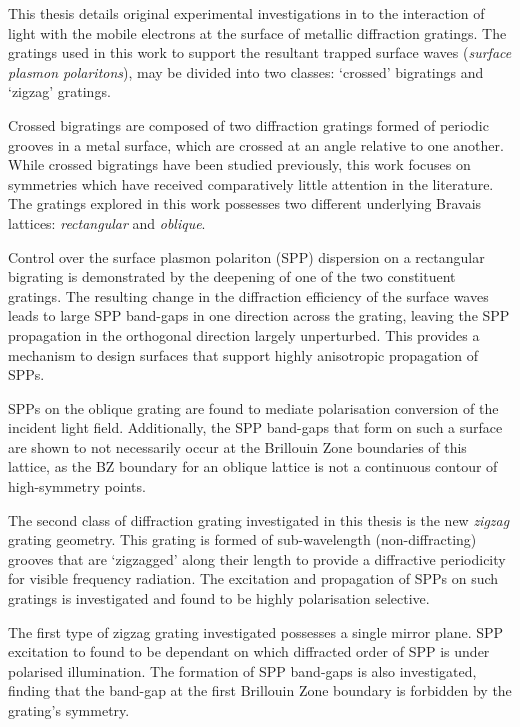 

\begin{abstracts}        %
This thesis details original experimental investigations in to the interaction of light with the mobile electrons at the surface of metallic diffraction gratings. The gratings used in this work to support the resultant trapped surface waves (\textit{surface plasmon polaritons}), may be divided into two classes: `crossed' bigratings and `zigzag' gratings. 

Crossed bigratings are composed of two diffraction gratings formed of periodic grooves in a metal surface, which are crossed at an angle relative to one another. While crossed bigratings have been studied previously, this work focuses on symmetries which have received comparatively little attention in the literature. The gratings explored in this work possesses two different underlying Bravais lattices: \textit{rectangular} and \textit{oblique}.

Control over the surface plasmon polariton (SPP) dispersion on a rectangular bigrating is demonstrated by the deepening of one of the two constituent gratings. The resulting change in the diffraction efficiency of the surface waves leads to large SPP band-gaps in one direction across the grating, leaving the SPP propagation in the orthogonal direction largely unperturbed. This provides a mechanism to design surfaces that support highly anisotropic propagation of SPPs.

SPPs on the oblique grating are found to mediate polarisation conversion of the incident light field. Additionally, the SPP band-gaps that form on such a surface are shown to not necessarily occur at the Brillouin Zone boundaries of this lattice, as the BZ boundary for an oblique lattice is not a continuous contour of high-symmetry points.

The second class of diffraction grating investigated in this thesis is the new \textit{zigzag} grating geometry. This grating is formed of sub-wavelength (non-diffracting) grooves that are `zigzagged' along their length to provide a diffractive periodicity for visible frequency radiation. The excitation and propagation of SPPs on such gratings is investigated and found to be highly polarisation selective. 

The first type of zigzag grating investigated possesses a single mirror plane. SPP excitation to found to be dependant on which diffracted order of SPP is under polarised illumination. The formation of SPP band-gaps is also investigated, finding that the band-gap at the first Brillouin Zone boundary is forbidden by the grating's symmetry.


\end{abstracts}
